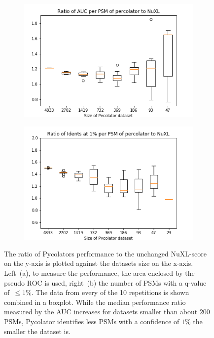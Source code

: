 \begin{figure}
	\normalsize
	\centering
	\begin{subfigure}{0.49 \textwidth}
		\includegraphics[width = \textwidth]{figures/auc_p_vs_ori.png}
		\caption{}
		\label{fig:results:small_dataset_snd_comparison_auc}
	\end{subfigure}
	\hfill
	\begin{subfigure}{0.49 \textwidth}
		\includegraphics[width = \textwidth]{figures/idents_p_vs_ori_zoomed.png}
		\caption{}
		\label{fig:results:small_dataset_snd_comparison_idents}
	\end{subfigure}
	\caption[Performance of Pycolator on smaller datasets]{The ratio of Pycolators performance to the unchanged NuXL-score on the y-axis is plotted against the datasets size on the x-axis. Left~(a), to measure the performance, the area enclosed by the pseudo ROC is used, right~(b) the number of PSMs with a q-value of~$\leq1\%$. The data from every of the 10 repetitions is shown combined in a boxplot. While the median performance ratio measured by the AUC increases for datasets smaller than about $200$ PSMs, Pycolator identifies less PSMs with a confidence of $1\%$ the smaller the dataset is.}
	\label{fig:results:small_dataset_snd_comparison}
\end{figure}
\renewcommand{\baselinestretch}{1}
	